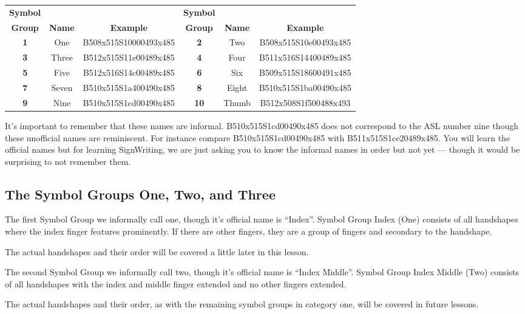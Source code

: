 \documentclass{article}
\begin{document}
\begin{center}
\begin{tabular}{ccc@{\hskip 5mm}ccc}
\textbf{Symbol}&&&\textbf{Symbol}\\
\textbf{Group}&\textbf{Name}&\textbf{Example}&\textbf{Group}&\textbf{Name}&\textbf{Example}\\
\textbf{1}&One  &B508x515S10000493x485&\textbf{2} &Two  &B508x515S10e00493x485\\
\textbf{3}&Three&B512x515S11e00489x485&\textbf{4} &Four &B511x516S14400489x485\\
\textbf{5}&Five &B512x516S14c00489x485&\textbf{6} &Six  &B509x515S18600491x485\\
\textbf{7}&Seven&B510x515S1a400490x485&\textbf{8} &Eight&B510x515S1ba00490x485\\
\textbf{9}&Nine &B510x515S1cd00490x485&\textbf{10}&Thumb&B512x508S1f500488x493\\
\end{tabular}
\end{center}

It's important to remember that these names are informal.
B510x515S1cd00490x485 does not correspond to the ASL number nine though these unofficial names are reminiscent.
For instance compare B510x515S1cd00490x485 with B511x515S1ce20489x485.
You will learn the official names but for learning SignWriting, we are just asking you to know the informal names in order but not yet --- though it would be surprising to not remember them.

\subsection{The Symbol Groups One, Two, and Three}

The first Symbol Group we informally call one, though it's official name is ``Index''.
Symbol Group Index (One) consists of all handshapes where the index finger features prominently.
If there are other fingers, they are a group of fingers and secondary to the handshape.

The actual handshapes and their order will be covered a little later in this lesson.

The second Symbol Group we informally call two, though it's official name is ``Index Middle''.
Symbol Group Index Middle (Two) consists of all handshapes with the index and middle finger extended and no other fingers extended.

The actual handshapes and their order, as with the remaining symbol groups in category one, will be covered in future lessons.
\end{document}
